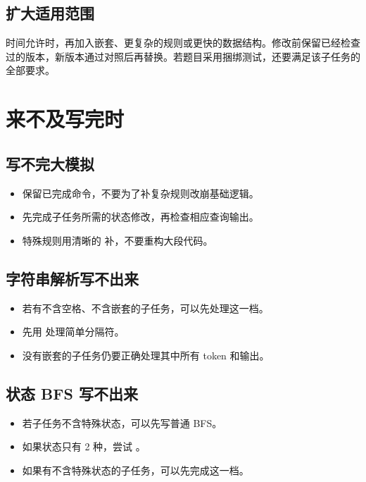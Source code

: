 \subsection{扩大适用范围}
时间允许时，再加入嵌套、更复杂的规则或更快的数据结构。修改前保留已经检查过的版本，新版本通过对照后再替换。若题目采用捆绑测试，还要满足该子任务的全部要求。

\section{来不及写完时}\label{sec:07-38}

\subsection{写不完大模拟}

\begin{itemize}
  \item 保留已完成命令，不要为了补复杂规则改崩基础逻辑。
  \item 先完成子任务所需的状态修改，再检查相应查询输出。
  \item 特殊规则用清晰的  补，不要重构大段代码。
\end{itemize}

\subsection{字符串解析写不出来}

\begin{itemize}
  \item 若有不含空格、不含嵌套的子任务，可以先处理这一档。
  \item 先用  处理简单分隔符。
  \item 没有嵌套的子任务仍要正确处理其中所有 token 和输出。
\end{itemize}

\subsection{状态 BFS 写不出来}

\begin{itemize}
  \item 若子任务不含特殊状态，可以先写普通 BFS。
  \item 如果状态只有 2 种，尝试 。
  \item 如果有不含特殊状态的子任务，可以先完成这一档。
\end{itemize}

